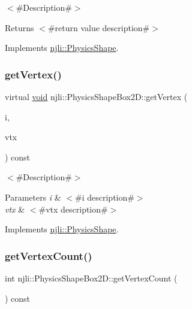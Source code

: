 $<$\#\+Description\#$>$

\begin{DoxyReturn}{Returns}
$<$\#return value description\#$>$ 
\end{DoxyReturn}


Implements \mbox{\hyperlink{classnjli_1_1_physics_shape_ac7c6b2ac373892095f8220d56f8ad6de}{njli\+::\+Physics\+Shape}}.

\mbox{\label{classnjli_1_1_physics_shape_box2_d_ad5d35467acfd3c047d0c85c9aa1ad415}} 
\subsubsection{\texorpdfstring{get\+Vertex()}{getVertex()}}
{\footnotesize\ttfamily virtual \mbox{\hyperlink{_thread_8h_af1e856da2e658414cb2456cb6f7ebc66}{void}} njli\+::\+Physics\+Shape\+Box2\+D\+::get\+Vertex (\begin{DoxyParamCaption}\item[{int}]{i,  }\item[{bt\+Vector3 \&}]{vtx }\end{DoxyParamCaption}) const\hspace{0.3cm}{\ttfamily [virtual]}}

$<$\#\+Description\#$>$


\begin{DoxyParams}{Parameters}
{\em i} & $<$\#i description\#$>$ \\
\hline
{\em vtx} & $<$\#vtx description\#$>$ \\
\hline
\end{DoxyParams}


Implements \mbox{\hyperlink{classnjli_1_1_physics_shape_acb05a16bdbfa5cee6dcbab5c253eb78e}{njli\+::\+Physics\+Shape}}.

\mbox{\label{classnjli_1_1_physics_shape_box2_d_a14448749c7d6f84beff490ca12acbd6f}} 
\subsubsection{\texorpdfstring{get\+Vertex\+Count()}{getVertexCount()}}
{\footnotesize\ttfamily int njli\+::\+Physics\+Shape\+Box2\+D\+::get\+Vertex\+Count (\begin{DoxyParamCaption}{ }\end{DoxyParamCaption}) const}

